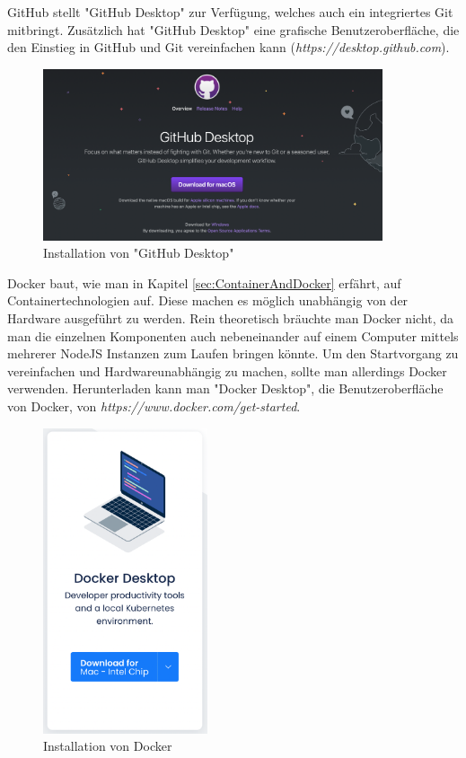 GitHub stellt "GitHub Desktop" zur Verfügung, welches auch ein integriertes Git mitbringt. Zusätzlich hat "GitHub Desktop" eine grafische  Benutzeroberfläche, die den Einstieg in GitHub und Git vereinfachen kann (\emph{https://desktop.github.com}). 

\begin{figure}[H]
    \centering
    \includegraphics[width=100mm]{media/Handbuch/github_desktop.png}
    \caption{Installation von "GitHub Desktop"}
    \label{fig:githubdesktop}
\end{figure}


Docker baut, wie man in Kapitel \ref{sec:ContainerAndDocker} erfährt, auf Containertechnologien auf. Diese machen es möglich unabhängig von der Hardware ausgeführt zu werden. Rein theoretisch bräuchte man Docker nicht, da man die einzelnen Komponenten auch nebeneinander auf einem Computer mittels mehrerer NodeJS Instanzen zum Laufen bringen könnte. Um den Startvorgang zu vereinfachen und Hardwareunabhängig zu machen, sollte man allerdings Docker verwenden. Herunterladen kann man "Docker Desktop", die Benutzeroberfläche von Docker, von \emph{https://www.docker.com/get-started}.

\begin{figure}[H]
    \centering
    \includegraphics[height=90mm]{media/Handbuch/dockerdesktop.png}
    \caption{Installation von Docker}
\end{figure}

